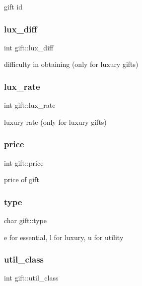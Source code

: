 gift id \mbox{\label{classgift_a9fc91faf6d0032fd7a68419b982628e4}} 
\subsubsection{\texorpdfstring{lux\+\_\+diff}{lux\_diff}}
{\footnotesize\ttfamily int gift\+::lux\+\_\+diff}

difficulty in obtaining (only for luxury gifts) \mbox{\label{classgift_a8fa920d81b0de62e1ac86e06448a9e59}} 
\subsubsection{\texorpdfstring{lux\+\_\+rate}{lux\_rate}}
{\footnotesize\ttfamily int gift\+::lux\+\_\+rate}

luxury rate (only for luxury gifts) \mbox{\label{classgift_a0b47f2fdc5eb88daa269cc827324c931}} 
\subsubsection{\texorpdfstring{price}{price}}
{\footnotesize\ttfamily int gift\+::price}

price of gift \mbox{\label{classgift_aaa535c180c93525e0b0452c660ac886d}} 
\subsubsection{\texorpdfstring{type}{type}}
{\footnotesize\ttfamily char gift\+::type}

\textquotesingle{}e\textquotesingle{} for essential, \textquotesingle{}l\textquotesingle{} for luxury, \textquotesingle{}u\textquotesingle{} for utility \mbox{\label{classgift_ae35e64b6107776d8affabb9c041cab61}} 
\subsubsection{\texorpdfstring{util\+\_\+class}{util\_class}}
{\footnotesize\ttfamily int gift\+::util\+\_\+class}

